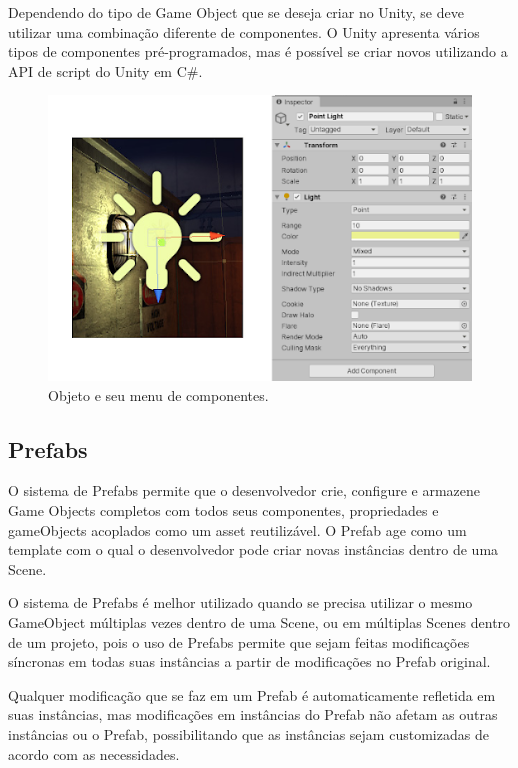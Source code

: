\documentclass[
	12pt,				%
	openright,			%
	twoside,			%
	a4paper,			%
	english,			%
	french,				%
	spanish,			%
	brazil				%
	]{abntex2}
\begin{document}
Dependendo do tipo de Game Object que se deseja criar no Unity, se deve utilizar uma combinação diferente de componentes. O Unity apresenta vários tipos de componentes pré-programados, mas é possível se criar novos utilizando a API de script do Unity em C\#.
\begin{figure}
  \includegraphics[width=\linewidth, scale = 0.2]{objprop.jpg}
  \caption{Objeto e seu menu de componentes.}
  \label{fig:objprop}
\end{figure}
\pagebreak
\subsection{Prefabs}

O sistema de Prefabs permite que o desenvolvedor crie, configure e armazene Game Objects completos com todos seus componentes, propriedades e gameObjects acoplados como um asset reutilizável. O Prefab age como um template com o qual o desenvolvedor pode criar novas instâncias dentro de uma Scene.

	O sistema de Prefabs é melhor utilizado quando se precisa utilizar o mesmo GameObject múltiplas vezes dentro de uma Scene, ou em múltiplas Scenes dentro de um projeto, pois o uso de Prefabs permite que sejam feitas modificações síncronas em todas suas instâncias a partir de modificações no Prefab original.
	
	Qualquer modificação que se faz em um Prefab é automaticamente refletida em suas instâncias, mas modificações em instâncias do Prefab não afetam as outras instâncias ou o Prefab, possibilitando que as instâncias sejam customizadas de acordo com as necessidades.
	
\end{document}
